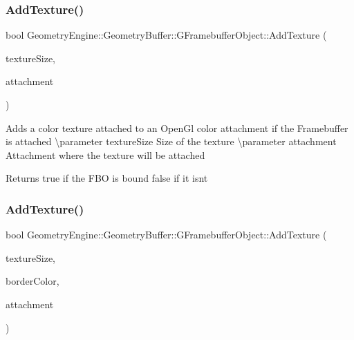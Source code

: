 \subsubsection{\texorpdfstring{AddTexture()}{AddTexture()}\hspace{0.1cm}{\footnotesize\ttfamily [2/3]}}
{\footnotesize\ttfamily bool Geometry\+Engine\+::\+Geometry\+Buffer\+::\+G\+Framebuffer\+Object\+::\+Add\+Texture (\begin{DoxyParamCaption}\item[{const Q\+Vector2D \&}]{texture\+Size,  }\item[{G\+Framebuffer\+Commons\+::\+G\+\_\+\+C\+O\+L\+O\+R\+\_\+\+A\+T\+T\+A\+C\+H\+M\+E\+N\+TS}]{attachment }\end{DoxyParamCaption})}

Adds a color texture attached to an Open\+Gl color attachment if the Framebuffer is attached \textbackslash{}parameter texture\+Size Size of the texture \textbackslash{}parameter attachment Attachment where the texture will be attached \begin{DoxyReturn}{Returns}
true if the F\+BO is bound false if it isn\textquotesingle{}t 
\end{DoxyReturn}
\mbox{\label{class_geometry_engine_1_1_geometry_buffer_1_1_g_framebuffer_object_abc4ab65f4ab2f63771d2dc1e36b4d45d}} 
\subsubsection{\texorpdfstring{AddTexture()}{AddTexture()}\hspace{0.1cm}{\footnotesize\ttfamily [3/3]}}
{\footnotesize\ttfamily bool Geometry\+Engine\+::\+Geometry\+Buffer\+::\+G\+Framebuffer\+Object\+::\+Add\+Texture (\begin{DoxyParamCaption}\item[{const Q\+Vector2D \&}]{texture\+Size,  }\item[{const Q\+Vector3D \&}]{border\+Color,  }\item[{G\+Framebuffer\+Commons\+::\+G\+\_\+\+C\+O\+L\+O\+R\+\_\+\+A\+T\+T\+A\+C\+H\+M\+E\+N\+TS}]{attachment }\end{DoxyParamCaption})}

